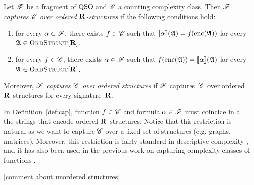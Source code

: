 \begin{definition} \label{def:cap}
	Let $\mathscr{F}$ be a fragment of ${\rm QSO}$ and $\mathscr{C}$ a counting complexity class. Then {\em  $\mathscr{F}$ captures $\mathscr{C}$ over ordered $\mathbf{R}$-structures} if the  following conditions hold:
	\begin{enumerate}
		\item for every $\alpha \in \mathscr{F}$, there exists $f \in \mathscr{C}$ such that ${\llbracket{}{\alpha}\rrbracket}(\mathfrak{A}) = f({\rm enc}(\mathfrak{A}))$ for every $\mathfrak{A} \in \text{\sc OrdStruct}[\mathbf{R}]$. 
		
		\item for every $f \in \mathscr{C}$, there exists $\alpha \in \mathscr{F}$ such that   $f({\rm enc}(\mathfrak{A})) = {\llbracket{}{\alpha}\rrbracket}(\mathfrak{A})$ for every $\mathfrak{A} \in \text{\sc OrdStruct}[\mathbf{R}]$.
	\end{enumerate} 
	Moreover, {\em $\mathscr{F}$ captures $\mathscr{C}$ over ordered structures} if $\mathscr{F}$ captures~$\mathscr{C}$ over ordered $\mathbf{R}$-structures for every signature~$\mathbf{R}$.
\end{definition}
In Definition~\ref{def:cap}, function $f \in \mathscr{C}$ and formula $\alpha \in \mathscr{F}$ must coincide in all the strings that encode ordered $\mathbf{R}$-structures. Notice that this restriction is natural as we want to capture %
$\mathscr{C}$ over a fixed set of structures (e.g. graphs, matrices).
Moreover, this restriction is fairly standard in descriptive complexity \cite{immerman1999descriptive,L04}, and it has also been used in the previous work on capturing complexity classes of functions \cite{SalujaST95,ComptonG96}.

[comment about unordered structures]

